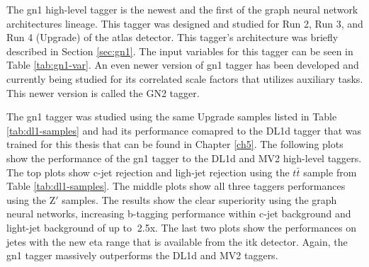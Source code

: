 The \gls{gn1} high-level tagger is the newest and the first of the graph neural network architectures lineage. This tagger was designed and 
studied for Run 2, Run 3, and Run 4 (Upgrade) of the \gls{atlas} detector. This tagger's architecture was briefly described in Section \ref{sec:gn1}.
The input variables for this tagger can be seen in Table \ref{tab:gn1-var}. An even newer version of \gls{gn1} tagger has been developed and 
currently being studied for its correlated scale factors that utilizes auxiliary tasks. This newer version is called the GN2 tagger. 
\par
The \gls{gn1} tagger was studied using the same Upgrade samples listed in Table \ref{tab:dl1-samples} and had its performance comapred to 
the DL1d tagger that was trained for this thesis that can be found in Chapter \ref{ch5}. The following 
plots show the performance of the \gls{gn1} tagger to the DL1d and MV2 high-level taggers. The top plots show c-jet rejection and ligh-jet rejection 
using the $t\bar{t}$ sample from Table \ref{tab:dl1-samples}. The middle plots show all three taggers performances using the $\textrm{Z}'$
samples. The results show the clear superiority using the graph neural networks, increasing b-tagging performance 
within c-jet background and light-jet background of up to $~$2.5x. The last two plots show the performances on jetes 
with the new eta range that is available from the \gls{itk} detector. Again, the \gls{gn1} tagger massively 
outperforms the DL1d and MV2 taggers.
\newpage
